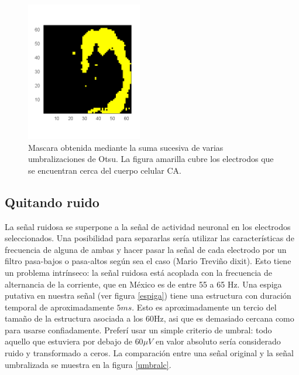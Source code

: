 \documentclass{article}
\begin{document}
\begin{figure}[h]
  \centering
  \includegraphics[width=0.45\textwidth]{MascaraOtsu01.png}
  \caption{Mascara obtenida mediante la suma sucesiva de varias
    umbralizaciones de Otsu. La figura amarilla cubre los electrodos
    que se encuentran cerca del cuerpo celular CA.} \label{OtsuMask}
\end{figure}  


\subsection{Quitando ruido}

La señal ruidosa se superpone a la señal de actividad neuronal en
los electrodos seleccionados. Una posibilidad para separarlas
sería utilizar las características de frecuencia de alguna de ambas 
y hacer pasar la señal de cada electrodo por un filtro pasa-bajos
o pasa-altos según sea el caso (Mario Treviño dixit).
Esto tiene un problema intrínseco: la señal ruidosa está acoplada
con la frecuencia de alternancia de la corriente, que en México es
de entre 55 a 65 Hz. Una espiga putativa en nuestra señal
(ver figura \ref{espiga}) tiene una estructura con duración
temporal de aproximadamente $5 ms$. Esto es aproximadamente 
un tercio del tamaño de la estructura asociada a los 60Hz,
asi que es demasiado cercana como para usarse confiadamente.
Preferí usar un simple criterio de umbral: todo aquello
que estuviera por debajo de $60\mu V$ en valor absoluto 
sería considerado ruido y transformado a ceros. La
comparación entre una señal original y la señal umbralizada
se muestra en la figura \ref{umbralc}.
\end{document}
